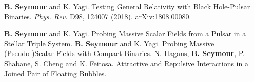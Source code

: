 



\begin{cvpublications}

  \cvpublication
    {\textbf{B. Seymour} and K. Yagi. Testing General Relativity with Black Hole-Pulsar Binaries. \textit{Phys. Rev.} D98, 124007 (2018). arXiv:1808.00080.} %
    


\end{cvpublications}



\begin{cvpublications}

  \cvpublication
    {\textbf{B. Seymour} and K. Yagi. Probing Massive Scalar Fields from a Pulsar in a Stellar Triple System.} %
    \cvpublication
    {\textbf{B. Seymour} and K. Yagi. Probing Massive (Pseudo-)Scalar Fields with Compact Binaries.} %
  \cvpublication
    {N. Hagans, \textbf{B. Seymour}, P. Shabane, S. Cheng and K. Feitosa. Attractive and Repulsive Interactions in a Joined Pair of Floating Bubbles.} %

\end{cvpublications}